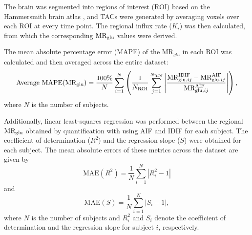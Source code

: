 The brain was segmented into regions of interest (ROI) based on the Hammersmith brain atlas \cite{hammers2003three}, and TACs were generated by averaging voxels over each ROI at every time point.
The regional influx rate (\(K_i\)) was then calculated, from which the corresponding \(\text{MR}_{\text{glu}}\) values were derived.

The mean absolute percentage error (MAPE) of the \(\textrm{MR}_{glu}\) in each ROI was calculated and then averaged across the entire dataset:
\begin{equation}
	\text{Average MAPE}(\text{MR}_{\text{glu}})= \frac{100\%}{N} \sum_{i=1}^{N} \left( \frac{1}{N_{\text{ROI}}} \sum_{j=1}^{N_{\text{ROI}}} \left| \frac{\textrm{MR}_{\textrm{glu},ij}^{\textrm{IDIF}} - \textrm{MR}_{\textrm{glu},ij}^{\textrm{AIF}}}{\textrm{MR}_{\textrm{glu},ij}^{\textrm{AIF}}} \right| \right),
\end{equation}
where $N$ is the number of subjects.

Additionally, linear least-squares regression was performed between the regional \(\text{MR}_{\text{glu}}\) obtained by quantification with using AIF and IDIF for each subject. The coefficient of determination (\(R^2\)) and the regression slope (\(S\)) were obtained for each subject. The mean absolute errors of these metrics across the dataset are given by
\begin{equation}
	\text{MAE}(R^2) = \frac{1}{N} \sum_{i=1}^{N} \left| R^2_i - 1 \right|
\end{equation}
and
\begin{equation}
	\text{MAE}(S) = \frac{1}{N} \sum_{i=1}^{N} \left| S_i - 1 \right|,
\end{equation}
where $N$ is the number of subjects and \(R^2_i\) and \(S_i\) denote the coefficient of determination and the regression slope for subject \(i\), respectively.

